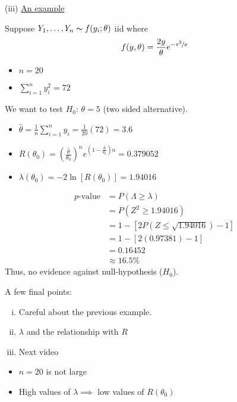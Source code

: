 (iii) \underline{An example}
\begin{exbox}
    \begin{example}
        Suppose $ Y_1,\ldots ,Y_n \thicksim f(y_i;\theta) $ iid where
        \[ f(y,\theta)=\frac{2y}{\theta}e^{-\nicefrac{y^2}{\theta}} \]
        \begin{itemize}
            \item $ n=20 $
            \item $ \sum\limits_{i=1}^{n} y_i^2=72 $
        \end{itemize}

        We want to test $ H_0 $: $ \theta=5 $ (two sided alternative).
        \begin{itemize}
            \item $ \hat{\theta}=\frac{1}{n} \sum\limits_{i=1}^{n}y_i=\frac{1}{20}(72)=3.6 $
            \item $ R(\theta_0)=\left( \frac{\hat{\theta}}{\theta_0} \right)^n
                      e^{\left(1-\frac{\hat{\theta}}{\theta_0}\right)n} = 0.379052 $
            \item $ \lambda(\theta_0) =-2\ln \left[ R(\theta_0) \right]=1.94016 $
        \end{itemize}
        \begin{align*}
            p\text{-value}
             & =P(\Lambda\geqslant \lambda)                       \\
             & =P(Z^2\geqslant 1.94016)                           \\
             & =1-\left[ 2 P(Z\leqslant \sqrt{1.94016})-1 \right] \\
             & = 1-\left[ 2(0.97381)-1 \right]                    \\
             & = 0.16452                                          \\
             & \approx 16.5\%
        \end{align*}
        Thus, no evidence against null-hypothesis ($ H_0 $).
    \end{example}
\end{exbox}
A few final points:
\begin{enumerate}[(i)]
    \item Careful about the previous example.
    \item $ \lambda $ and the relationship with $ R $
    \item Next video
\end{enumerate}
\begin{itemize}
    \item $ n=20 $ is not large
    \item High values of $ \lambda\implies $ low values of $ R(\theta_0) $
\end{itemize}
